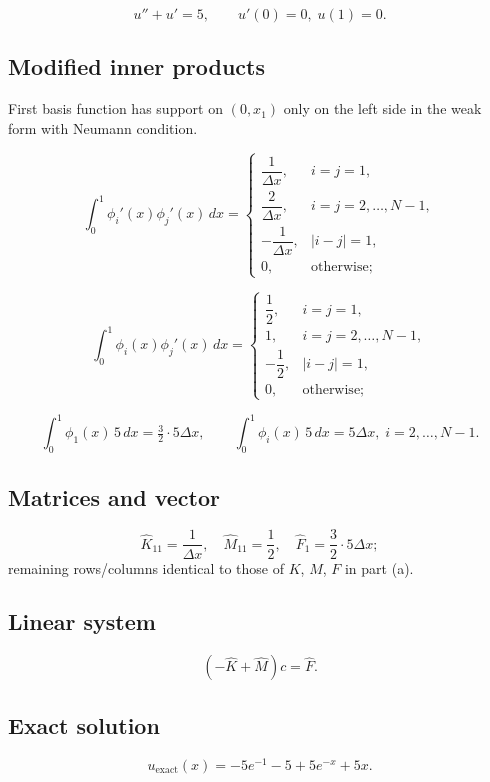 \documentclass{article}
\begin{document}
\[
u''+u'=5,\qquad u'(0)=0,\;u(1)=0.
\]

\subsection*{Modified inner products}

First basis function has support on $(0,x_1)$ only on the left side in the weak form with Neumann condition.

\[
\int_0^1\phi_i'(x)\phi_j'(x)\,dx=
\begin{cases}
\dfrac{1}{\Delta x}, & i=j=1,\\[6pt]
\dfrac{2}{\Delta x}, & i=j=2,\dots ,N-1,\\[6pt]
-\dfrac{1}{\Delta x}, & |i-j|=1,\\[6pt]
0, & \text{otherwise};
\end{cases}
\]

\[
\int_0^1\phi_i(x)\phi_j'(x)\,dx=
\begin{cases}
\dfrac12, & i=j=1,\\[6pt]
1, & i=j=2,\dots ,N-1,\\[6pt]
-\dfrac12, & |i-j|=1,\\[6pt]
0, & \text{otherwise};
\end{cases}
\]

\[
\int_0^1\phi_1(x)\,5\,dx=\tfrac32\cdot5\Delta x,\qquad
\int_0^1\phi_i(x)\,5\,dx=5\Delta x,\;i=2,\dots ,N-1.
\]

\subsection*{Matrices and vector}

\[
\widehat K_{11}=\frac1{\Delta x},\quad
\widehat M_{11}=\frac12,\quad
\widehat F_1=\frac32\cdot5\Delta x;
\]
remaining rows/columns identical to those of $K$, $M$, $F$ in part (a).

\subsection*{Linear system}

\[
(-\widehat K+\widehat M)c=\widehat F.
\]

\subsection*{Exact solution}

\[
u_{\mathrm{exact}}(x)= -5e^{-1}-5+5e^{-x}+5x.
\]

\newpage
\end{document}
